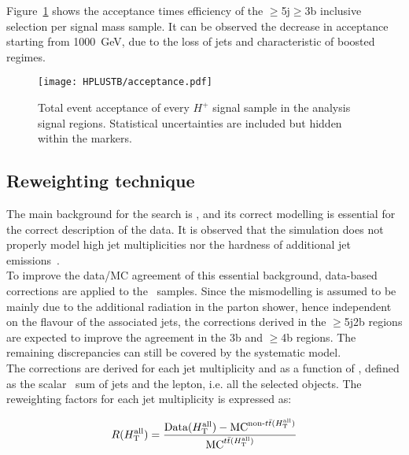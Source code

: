 Figure~\ref{Hplustb:acceptance} shows the acceptance times efficiency of the $\geq$5j$\geq$3b inclusive selection per signal mass sample. It can be observed the decrease in acceptance starting from 1000~GeV, due to the loss of jets and characteristic of boosted regimes.

\begin{figure}[htbp]
    \RawFloats
    \begin{center}
    \texttt{[image: HPLUSTB/acceptance.pdf]}
    \caption{
        Total event acceptance of every $H^+$ signal sample in the analysis signal regions. Statistical uncertainties are included but hidden within the markers.
    }
    \label{Hplustb:acceptance}
    \end{center}
\end{figure}

\clearpage
\subsection{Reweighting technique}
\label{Hplustb:secRW}
The main background for the search is \ttjets, and its correct modelling is essential for the correct description of the data. It is observed that the simulation does not properly model high jet multiplicities nor the hardness of additional jet emissions~\cite{ATL-PHYS-PUB-2018-009,10.1007/JHEP01(2021)033}.\\

To improve the data/MC agreement of this essential background, data-based corrections are applied to the \ttbar\ samples. Since the mismodelling is assumed to be mainly due to the additional radiation in the parton shower, hence independent on the flavour of the associated jets, the corrections derived in the $\geq$5j2b regions are expected to improve the agreement in the 3b and $\geq$4b regions. The remaining discrepancies can still be covered by the systematic model.\\

The corrections are derived for each jet multiplicity and as a function of \HTall, defined as the scalar \pT\ sum of jets and the lepton, i.e. all the selected objects. The reweighting factors for each jet multiplicity is expressed as:

\begin{equation}
    \label{Hplustb:RWeq}
    R(H_{\text{T}}^{\text{all}})=\frac{ \text{Data}(H_{\text{T}}^{\text{all}}) - \text{MC}^{\text{non-\ensuremath{t\bar{t}}}(H_{\text{T}}^{\text{all}})} }{\text{MC}^{\text{\ensuremath{t\bar{t}}}(H_{\text{T}}^{\text{all}})}}
\end{equation}

